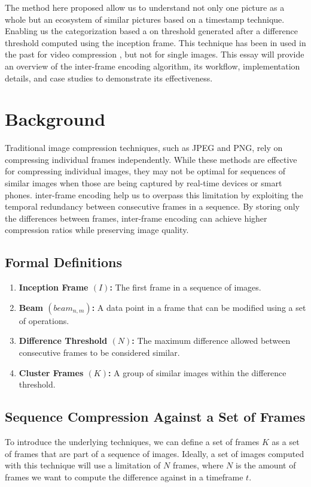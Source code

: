 \documentclass[twocolumn]{article}
\begin{document}
The method here proposed allow us to understand not only one picture as a whole but an ecosystem of similar pictures \cite{lee2002compressing} based on a timestamp technique. Enabling us the categorization based a on threshold generated after a difference threshold computed using the inception frame. This technique has been in used in the past for video compression \cite{wang2012memory}, but not for single images. This essay will provide an overview of the inter-frame encoding algorithm, its workflow, implementation details, and case studies to demonstrate its effectiveness.

\section{Background}
Traditional image compression techniques, such as JPEG and PNG, rely on compressing individual frames independently. While these methods are effective for compressing individual images, they may not be optimal for sequences of similar images when those are being captured by real-time devices or smart phones. inter-frame encoding help us to overpass this limitation by exploiting the temporal redundancy between consecutive frames in a sequence. By storing only the differences between frames, inter-frame encoding can achieve higher compression ratios while preserving image quality.

\subsection{Formal Definitions}

\begin{enumerate}
    \item \textbf{Inception Frame $(I)$:} The first frame in a sequence of images.
    \item \textbf{Beam $(beam_{n,m})$:} A data point in a frame that can be modified using a set of operations.
    \item \textbf{Difference Threshold $(N)$:} The maximum difference allowed between consecutive frames to be considered similar.
    \item \textbf{Cluster Frames $(K)$:} A group of similar images within the difference threshold.
\end{enumerate}


\subsection{Sequence Compression Against a Set of Frames}
To introduce the underlying techniques, we can define a set of frames $K$ as a set of frames that are part of a sequence of images. Ideally, a set of images computed with this technique will use a limitation of $N$ frames, where $N$ is the amount of frames we want to compute the difference against in a timeframe $t$.
\end{document}
